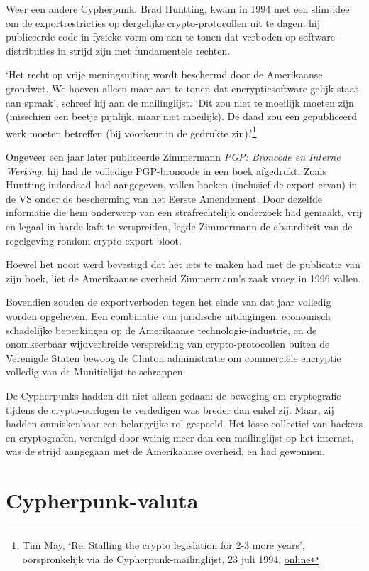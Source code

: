 \documentclass[smalldemyvopaper,11pt,twoside,onecolumn,openright,extrafontsizes,hidelinks]{memoir}
\begin{document}
Weer een andere Cypherpunk, Brad Huntting, kwam in 1994 met een slim
idee om de exportrestricties op dergelijke crypto-protocollen uit te
dagen: hij publiceerde code in fysieke vorm om aan te tonen dat verboden
op software-distributies in strijd zijn met fundamentele rechten.

`Het recht op vrije meningsuiting wordt beschermd door de Amerikaanse
grondwet. We hoeven alleen maar aan te tonen dat encryptiesoftware
gelijk staat aan spraak', schreef hij aan de mailinglijst. `Dit zou niet
te moeilijk moeten zijn (misschien een beetje pijnlijk, maar niet
moeilijk). De daad zou een gepubliceerd werk moeten betreffen (bij
voorkeur in de gedrukte zin).'\footnote{Tim May, `Re: Stalling the
  crypto legislation for 2-3 more years', oorspronkelijk via de
  Cypherpunk-mailinglijst, 23 juli 1994,
  \href{https://cypherpunks.venona.com/date/1994/07/msg01245.html}{online}}

Ongeveer een jaar later publiceerde Zimmermann \emph{PGP: Broncode en
Interne Werking}: hij had de volledige PGP-broncode in een boek
afgedrukt. Zoals Huntting inderdaad had aangegeven, vallen boeken
(inclusief de export ervan) in de VS onder de bescherming van het Eerste
Amendement. Door dezelfde informatie die hem onderwerp van een
strafrechtelijk onderzoek had gemaakt, vrij en legaal in harde kaft te
verspreiden, legde Zimmermann de absurditeit van de regelgeving rondom
crypto-export bloot.

Hoewel het nooit werd bevestigd dat het iets te maken had met de
publicatie van zijn boek, liet de Amerikaanse overheid Zimmermann's zaak
vroeg in 1996 vallen.

Bovendien zouden de exportverboden tegen het einde van dat jaar volledig
worden opgeheven. Een combinatie van juridische uitdagingen, economisch
schadelijke beperkingen op de Amerikaanse technologie-industrie, en de
onomkeerbaar wijdverbreide verspreiding van crypto-protocollen buiten de
Verenigde Staten bewoog de Clinton administratie om commerciële
encryptie volledig van de Munitielijst te schrappen.

De Cypherpunks hadden dit niet alleen gedaan: de beweging om
cryptografie tijdens de crypto-oorlogen te verdedigen was breder dan
enkel zij. Maar, zij hadden onmiskenbaar een belangrijke rol gespeeld.
Het losse collectief van hackers en cryptografen, verenigd door weinig
meer dan een mailinglijst op het internet, was de strijd aangegaan met
de Amerikaanse overheid, en had gewonnen.

\chapter{Cypherpunk-valuta}\label{cypherpunk-valuta}
\end{document}
